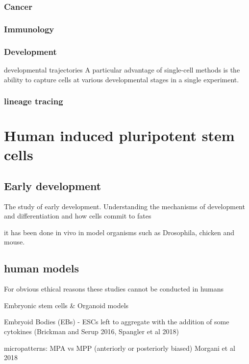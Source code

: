 \subsubsection{Cancer}
\subsubsection{Immunology}
\subsubsection{Development}

developmental trajectories 
A particular advantage of single-cell methods is the ability to capture cells at various developmental
stages in a single experiment.

\subsubsection{lineage tracing}

\newpage

\section{Human induced pluripotent stem cells}  %

\subsection{Early development}

The study of early development.
Understanding the mechanisms of development and differentiation and how cells commit to fates 

it has been done in vivo in model organisms such as Drosophila, chicken and mouse.

\subsection{human models}

For obvious ethical reasons these studies cannot be conducted in humans


Embryonic stem cells \& Organoid models

Embryoid Bodies (EBs) - ESCs left to aggregate with the addition of some cytokines (Brickman and Serup 2016, Spangler et al 2018)

micropatterns: MPA vs MPP (anteriorly or posteriorly biased)
Morgani et al 2018

